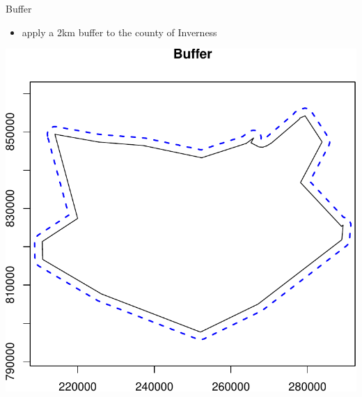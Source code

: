 \documentclass[10pt,ignorenonframetext,]{beamer}
\newenvironment{Shaded}{\begin{snugshade}}{\end{snugshade}}
\newcommand{\KeywordTok}[1]{\textcolor[rgb]{0.13,0.29,0.53}{\textbf{{#1}}}}
\newcommand{\DataTypeTok}[1]{\textcolor[rgb]{0.13,0.29,0.53}{{#1}}}
\newcommand{\DecValTok}[1]{\textcolor[rgb]{0.00,0.00,0.81}{{#1}}}
\newcommand{\StringTok}[1]{\textcolor[rgb]{0.31,0.60,0.02}{{#1}}}
\newcommand{\NormalTok}[1]{{#1}}
\providecommand{\tightlist}{%
  \setlength{\itemsep}{0pt}\setlength{\parskip}{0pt}}
\begin{document}
\begin{frame}[fragile]{Buffer}

\begin{itemize}
\tightlist
\item
  apply a 2km buffer to the county of Inverness
\end{itemize}

\begin{Shaded}
\end{Shaded}

\begin{center}\includegraphics[width=0.5\linewidth]{SpatialDataLecture_files/figure-beamer/buf_inverness-1} \end{center}

\end{frame}
\end{document}
